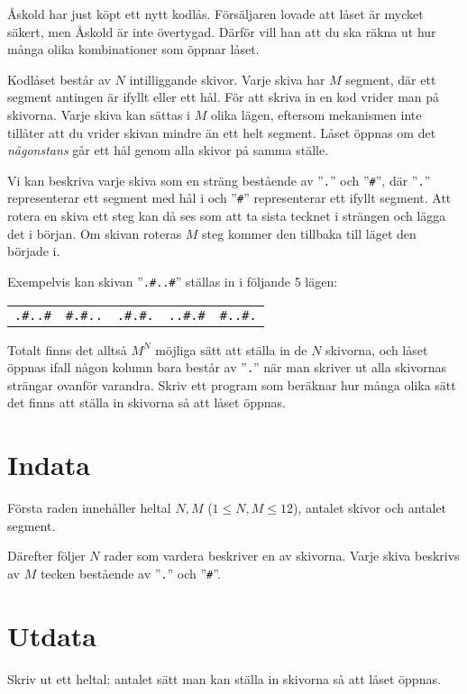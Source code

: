 Åskold har just köpt ett nytt kodlås.
Försäljaren lovade att låset är mycket säkert, men Åskold är inte övertygad.
Därför vill han att du ska räkna ut hur många olika kombinationer som öppnar låset.

Kodlåset består av $N$ intilliggande skivor.
Varje skiva har $M$ segment, där ett segment antingen är ifyllt eller ett hål.
För att skriva in en kod vrider man på skivorna.
Varje skiva kan sättas i $M$ olika lägen, eftersom mekanismen inte tillåter att du vrider skivan mindre än ett helt segment.
Låset öppnas om det \emph{någonstans} går ett hål genom alla skivor på samma ställe.

Vi kan beskriva varje skiva som en sträng bestående av ”\texttt{.}” och ”\texttt{\#}”,
där ”\texttt{.}” representerar ett segment med hål i och ”\texttt{\#}” representerar ett ifyllt segment.
Att rotera en skiva ett steg kan då ses som att ta sista tecknet i strängen och lägga det i början.
Om skivan roteras $M$ steg kommer den tillbaka till läget den började i.

Exempelvis kan skivan ”\texttt{.\#..\#}” ställas in i följande 5 lägen:

\begin{center}
  \begin{tabular}{c|c|c|c|c}
	{\centering \texttt{.\#..\#}} &
	{\centering \texttt{\#.\#..}} &
	{\centering \texttt{.\#.\#.}} &
	{\centering \texttt{..\#.\#}} &
	{\centering \texttt{\#..\#.}}
  \end{tabular}
\end{center}

Totalt finns det alltså $M^N$ möjliga sätt att ställa in de $N$ skivorna, och låset öppnas ifall någon kolumn bara består av ”\texttt{.}” 
när man skriver ut alla skivornas strängar ovanför varandra. Skriv ett program som beräknar hur många olika sätt det finns att ställa in skivorna så att låset öppnas.

\section*{Indata}
Första raden innehåller heltal $N, M$ ($1\le N, M \le 12$), antalet skivor och antalet segment.

Därefter följer $N$ rader som vardera beskriver en av skivorna.
Varje skiva beskrivs av $M$ tecken bestående av ”\texttt{.}” och ”\texttt{\#}”.

\section*{Utdata}
Skriv ut ett heltal: antalet sätt man kan ställa in skivorna så att låset öppnas.

